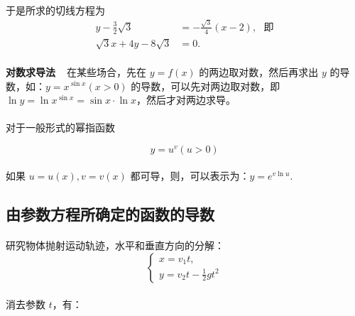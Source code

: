 \paragraph{}
于是所求的切线方程为
\begin{align*}
y - \frac{3}{2}\sqrt{3} &= -\frac{\sqrt{3}}{4}(x - 2), \text{~~即}\\
\sqrt{3}x + 4y - 8\sqrt{3} &= 0.
\end{align*}

\paragraph{}
\textbf{对数求导法~~}在某些场合，先在 $y = f(x)$ 的两边取对数，然后再求出 $y$ 的导数，如：$y = x^{\sin x} (x > 0)$ 的导数，可以先对两边取对数，即 $\ln y = \ln x^{\sin x} = \sin x \cdot \ln x$，然后才对两边求导。

\paragraph{}
对于一般形式的幂指函数

\begin{equation}
y = u^v (u > 0)
\end{equation}

\paragraph{}
如果 $u = u(x), v = v(x)$ 都可导，则，可以表示为：$y = e^{v \ln u}.$

\subsection{由参数方程所确定的函数的导数}
\paragraph{}
研究物体抛射运动轨迹，水平和垂直方向的分解：
\begin{equation}
\left\{
  \begin{array}{l}
    x = v_1 t, \\
    y = v_2 t - \frac{1}{2}gt^2
  \end{array}
\right.
\end{equation}

\paragraph{}
消去参数 $t$，有：

